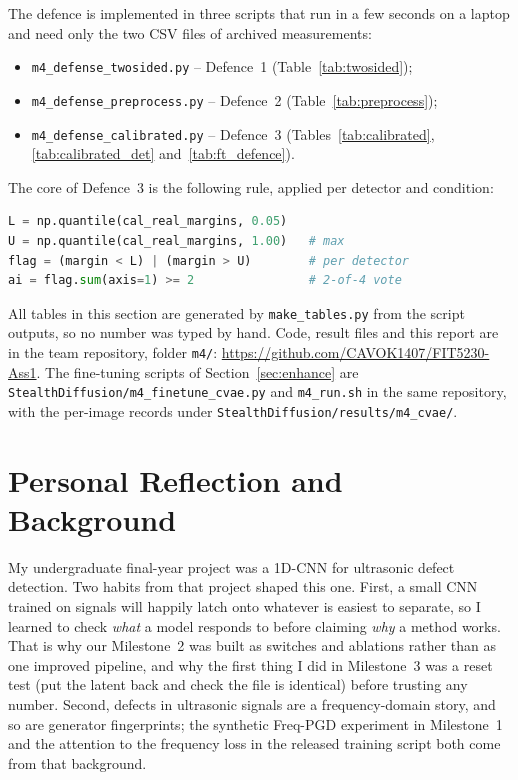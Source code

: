 \documentclass[journal]{IEEEtran}
\begin{document}
The defence is implemented in three scripts that run in a few seconds on a laptop and need only the two CSV files of archived measurements:
\begin{itemize}
  \item \texttt{m4\_defense\_twosided.py} -- Defence~1 (Table~\ref{tab:twosided});
  \item \texttt{m4\_defense\_preprocess.py} -- Defence~2 (Table~\ref{tab:preprocess});
  \item \texttt{m4\_defense\_calibrated.py} -- Defence~3 (Tables~\ref{tab:calibrated}, \ref{tab:calibrated_det} and~\ref{tab:ft_defence}).
\end{itemize}
The core of Defence~3 is the following rule, applied per detector and condition:
\begin{lstlisting}[language=Python]
L = np.quantile(cal_real_margins, 0.05)
U = np.quantile(cal_real_margins, 1.00)   # max
flag = (margin < L) | (margin > U)        # per detector
ai = flag.sum(axis=1) >= 2                # 2-of-4 vote
\end{lstlisting}
All tables in this section are generated by \texttt{make\_tables.py} from the script outputs, so no number was typed by hand. Code, result files and this report are in the team repository, folder \texttt{m4/}: \url{https://github.com/CAVOK1407/FIT5230-Ass1}. The fine-tuning scripts of Section~\ref{sec:enhance} are \texttt{StealthDiffusion/m4\_finetune\_cvae.py} and \texttt{m4\_run.sh} in the same repository, with the per-image records under \texttt{StealthDiffusion/results/m4\_cvae/}.

\section{Personal Reflection and Background}
\label{sec:reflection}

My undergraduate final-year project was a 1D-CNN for ultrasonic defect detection. Two habits from that project shaped this one. First, a small CNN trained on signals will happily latch onto whatever is easiest to separate, so I learned to check \emph{what} a model responds to before claiming \emph{why} a method works. That is why our Milestone~2 was built as switches and ablations rather than as one improved pipeline, and why the first thing I did in Milestone~3 was a reset test (put the latent back and check the file is identical) before trusting any number. Second, defects in ultrasonic signals are a frequency-domain story, and so are generator fingerprints; the synthetic Freq-PGD experiment in Milestone~1 and the attention to the frequency loss in the released training script both come from that background.
\end{document}
